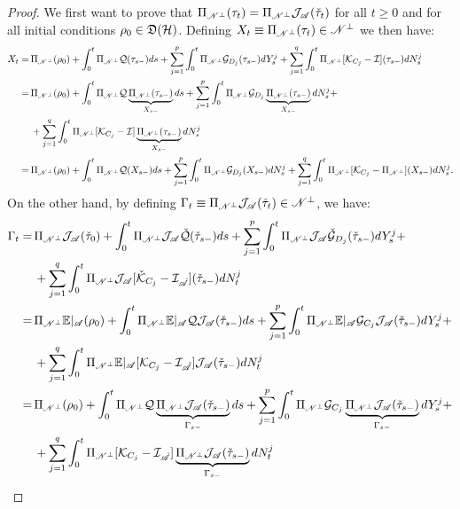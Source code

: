 \documentclass[aihp,12pt]{imsart}
\begin{document}
\begin{proof}
    We first want to prove that $\Pi_{\mathscr{N}^\perp}(\tau_t) = \Pi_{\mathscr{N}^\perp}\mathcal{J}_{\mathscr{A}}(\check{\tau}_t)$ for all $t\geq0$ and for all initial conditions $\rho_0\in\mathfrak{D}(\mathcal{H})$. Defining $X_t \equiv \Pi_{\mathscr{N}^\perp}(\tau_t)\in\mathscr{N}^\perp$ we then have:
    \begin{align*}
         X_t =\,&\Pi_{\mathscr{N}^\perp}(\rho_0) + \int_{0}^t \Pi_{\mathscr{N}^\perp}\mathcal{Q}(\tau_{s-}) ds + \sum_{j=1}^p \int_{0}^t \Pi_{\mathscr{N}^\perp}\mathcal{G}_{D_j}(\tau_{s-}) dY_s^j + \sum_{j=1}^q \int_{0}^t \Pi_{\mathscr{N}^\perp}[\mathcal{K}_{C_j}-\mathcal{I}](\tau_{s-}) dN_s^j \\
        =\,& \Pi_{\mathscr{N}^\perp}(\rho_0) + \int_{0}^t \Pi_{\mathscr{N}^\perp}\mathcal{Q}\underbrace{\Pi_{\mathscr{N}^\perp} (\tau_{s-})}_{X_{s-}} ds + \sum_{j=1}^p \int_{0}^t \Pi_{\mathscr{N}^\perp}\mathcal{G}_{D_j}\underbrace{\Pi_{\mathscr{N}^\perp}(\tau_{s-})}_{X_{s-}} dN_s^j +\\&
        +\sum_{j=1}^q \int_{0}^t \Pi_{\mathscr{N}^\perp}[\mathcal{K}_{C_j}-\mathcal{I}]\underbrace{\Pi_{\mathscr{N}^\perp}(\tau_{s-})}_{X_{s-}} dN_s^j \\
        =\,& \Pi_{\mathscr{N}^\perp}(\rho_0) + \int_{0}^t \Pi_{\mathscr{N}^\perp}\mathcal{Q} ({X_{s-}}) ds + \sum_{j=1}^p \int_{0}^t \Pi_{\mathscr{N}^\perp}\mathcal{G}_{D_j}({X_{s-}}) dN_s^j 
        +\sum_{j=1}^q \int_{0}^t \Pi_{\mathscr{N}^\perp}[\mathcal{K}_{C_j}-\Pi_{\mathscr{N}^\perp}]({X_{s-}}) dN_s^j.
    \end{align*}
    On the other hand, by defining $\Gamma_t\equiv \Pi_{\mathscr{N}^\perp}\mathcal{J}_{\mathscr{A}}(\check{\tau}_t)\in\mathscr{N}^\perp$, we have: 
    \begin{align*}
        \Gamma_t =\,& \Pi_{\Ns^\perp}\Jc_{\As}(\check{\tau}_0) + \int_{0}^t \Pi_{\Ns^\perp}\Jc_{\As}\check{\Qc}(\check{\tau}_{s-}) ds + \sum_{j=1}^p \int_{0}^t \Pi_{\Ns^\perp}\Jc_{\As}\check{\Gc}_{D_j}(\check{\tau}_{s-}) dY_s^j + \\&+ \sum_{j=1}^q \int_0^t \Pi_{\Ns^\perp}\Jc_{\As} [\check{\Kc}_{C_j}-\Ic_{\check{\As}}](\check{\tau}_{s-}) dN_t^j\\
        =\,& \Pi_{\Ns^\perp}\CE_\As (\rho_0) + \int_{0}^t \Pi_{\Ns^\perp}\CE_\As{\Qc}  {\Jc_{\As}(\check{\tau}_{s-})} ds + \sum_{j=1}^p \int_{0}^t \Pi_{\Ns^\perp}\CE_\As{\Gc}_{C_j} {\Jc_{\As}(\check{\tau}_{s-})} dY_s^j  + \\&+ \sum_{j=1}^q  \int_0^t \Pi_{\Ns^\perp} \CE_\As [{\Kc}_{C_j}-\Ic_{\check{\As}}]{\Jc_{\As}(\check{\tau}_{s-})} dN_t^j \\
        =\,& \Pi_{\Ns^\perp}(\rho_0) + \int_{0}^t \Pi_{\Ns^\perp}{\Qc}  \underbrace{\Pi_{\Ns^\perp}\Jc_{\As}(\check{\tau}_{s-})}_{\Gamma_{s-}} ds + \sum_{j=1}^p \int_{0}^t \Pi_{\Ns^\perp}{\Gc}_{C_j} \underbrace{\Pi_{\Ns^\perp}\Jc_{\As}(\check{\tau}_{s-})}_{\Gamma_{s-}} dY_s^j  + \\&+ \sum_{j=1}^q  \int_0^t \Pi_{\Ns^\perp} [{\Kc}_{C_j}-\Ic_{\check{\As}}]\underbrace{\Pi_{\Ns^\perp}\Jc_{\As}(\check{\tau}_{s-})}_{\Gamma_{s-}} dN_t^j \\

\end{align*}
\end{proof}
\end{document}
